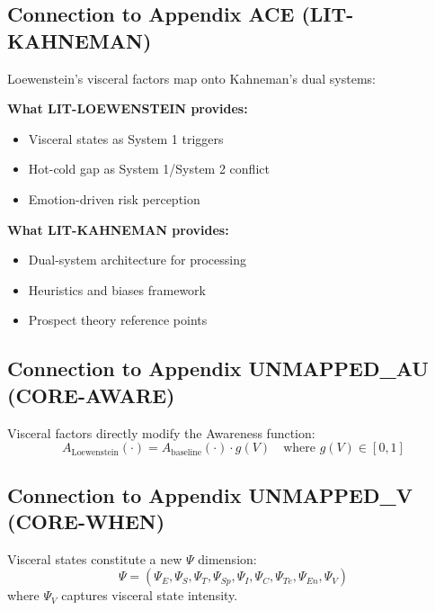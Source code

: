 \subsection{Connection to Appendix ACE (LIT-KAHNEMAN)}

Loewenstein's visceral factors map onto Kahneman's dual systems:

\begin{tcolorbox}[colback=yellow!5!white, colframe=yellow!75!black,
    title=Integration: LIT-LOEWENSTEIN $\leftrightarrow$ LIT-KAHNEMAN]
\textbf{What LIT-LOEWENSTEIN provides:}
\begin{itemize}[nosep]
\item Visceral states as System 1 triggers
\item Hot-cold gap as System 1/System 2 conflict
\item Emotion-driven risk perception
\end{itemize}

\textbf{What LIT-KAHNEMAN provides:}
\begin{itemize}[nosep]
\item Dual-system architecture for processing
\item Heuristics and biases framework
\item Prospect theory reference points
\end{itemize}
\end{tcolorbox}

\subsection{Connection to Appendix UNMAPPED_AU (CORE-AWARE)}

Visceral factors directly modify the Awareness function:
\begin{equation}
A_{\text{Loewenstein}}(\cdot) = A_{\text{baseline}}(\cdot) \cdot g(V) \quad \text{where } g(V) \in [0,1]
\end{equation}

\subsection{Connection to Appendix UNMAPPED_V (CORE-WHEN)}

Visceral states constitute a new $\Psi$ dimension:
\begin{equation}
\Psi = (\Psi_E, \Psi_S, \Psi_T, \Psi_{Sp}, \Psi_I, \Psi_C, \Psi_{Te}, \Psi_{En}, \textbf{$\Psi_V$})
\end{equation}
where $\Psi_V$ captures visceral state intensity.



